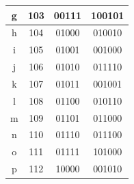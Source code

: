 \documentclass[%
    corpo=11pt,
    twoside,
    stile=classica,
    oldstyle,
    autoretitolo,
    tipotesi=magistrale,
    greek,
    evenboxes,
    english
]{toptesi}
\begin{document}
\begin{table}[]
\begin{tabular}{|c|c|c|c|}
g             & 103                                                           & 00111                                                                        & 100101                                                                       \\ \hline
h             & 104                                                           & 01000                                                                        & 010010                                                                       \\ \hline
i             & 105                                                           & 01001                                                                        & 001000                                                                       \\ \hline
j             & 106                                                           & 01010                                                                        & 011110                                                                       \\ \hline
k             & 107                                                           & 01011                                                                        & 001001                                                                       \\ \hline
l             & 108                                                           & 01100                                                                        & 010110                                                                       \\ \hline
m             & 109                                                           & 01101                                                                        & 011000                                                                       \\ \hline
n             & 110                                                           & 01110                                                                        & 011100                                                                       \\ \hline
o             & 111                                                           & 01111                                                                        & 101000                                                                       \\ \hline
p             & 112                                                           & 10000                                                                        & 001010                                                                       \\ \hline

\end{tabular}
\end{table}
\end{document}
